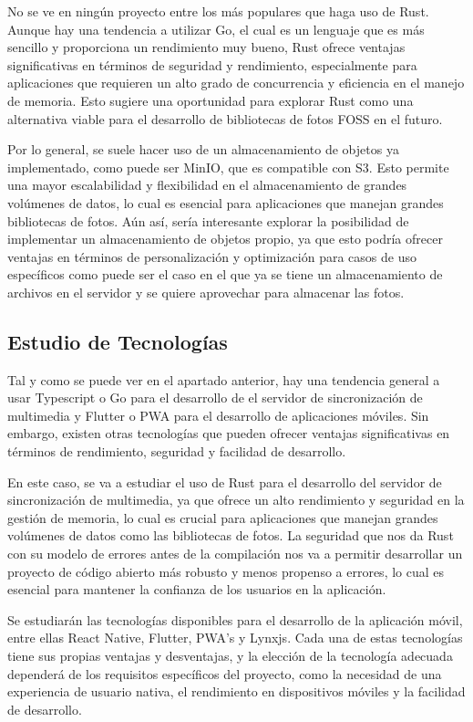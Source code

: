 No se ve en ningún proyecto entre los más populares que haga uso de Rust. Aunque hay una tendencia a utilizar Go, el cual es un lenguaje que es más sencillo y proporciona un rendimiento muy bueno, Rust ofrece ventajas significativas en términos de seguridad y rendimiento, especialmente para aplicaciones que requieren un alto grado de concurrencia y eficiencia en el manejo de memoria. Esto sugiere una oportunidad para explorar Rust como una alternativa viable para el desarrollo de bibliotecas de fotos FOSS en el futuro.

Por lo general, se suele hacer uso de un almacenamiento de objetos ya implementado, como puede ser MinIO, que es compatible con S3. Esto permite una mayor escalabilidad y flexibilidad en el almacenamiento de grandes volúmenes de datos, lo cual es esencial para aplicaciones que manejan grandes bibliotecas de fotos.
Aún así, sería interesante explorar la posibilidad de implementar un almacenamiento de objetos propio, ya que esto podría ofrecer ventajas en términos de personalización y optimización para casos de uso específicos como puede ser el caso en el que ya se tiene un almacenamiento de archivos en el servidor y se quiere aprovechar para almacenar las fotos.

\subsection{Estudio de Tecnologías}

Tal y como se puede ver en el apartado anterior, hay una tendencia general a usar Typescript o Go para el desarrollo de el servidor de sincronización de multimedia y Flutter o PWA para el desarrollo de aplicaciones móviles. Sin embargo, existen otras tecnologías que pueden ofrecer ventajas significativas en términos de rendimiento, seguridad y facilidad de desarrollo.

En este caso, se va a estudiar el uso de Rust para el desarrollo del servidor de sincronización de multimedia, ya que ofrece un alto rendimiento y seguridad en la gestión de memoria, lo cual es crucial para aplicaciones que manejan grandes volúmenes de datos como las bibliotecas de fotos.
La seguridad que nos da Rust con su modelo de errores antes de la compilación nos va a permitir desarrollar un proyecto de código abierto más robusto y menos propenso a errores, lo cual es esencial para mantener la confianza de los usuarios en la aplicación.

Se estudiarán las tecnologías disponibles para el desarrollo de la aplicación móvil, entre ellas React Native, Flutter, PWA's y Lynxjs. Cada una de estas tecnologías tiene sus propias ventajas y desventajas, y la elección de la tecnología adecuada dependerá de los requisitos específicos del proyecto, como la necesidad de una experiencia de usuario nativa, el rendimiento en dispositivos móviles y la facilidad de desarrollo.

